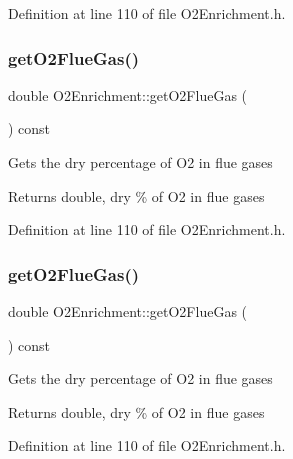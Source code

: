 Definition at line 110 of file O2\+Enrichment.\+h.

\mbox{\label{class_o2_enrichment_a1d31e1aef5f5a92f38c9a07216d0e539}} 
\subsubsection{\texorpdfstring{get\+O2\+Flue\+Gas()}{getO2FlueGas()}\hspace{0.1cm}{\footnotesize\ttfamily [2/3]}}
{\footnotesize\ttfamily double O2\+Enrichment\+::get\+O2\+Flue\+Gas (\begin{DoxyParamCaption}{ }\end{DoxyParamCaption}) const\hspace{0.3cm}{\ttfamily [inline]}}

Gets the dry percentage of O2 in flue gases \begin{DoxyReturn}{Returns}
double, dry \% of O2 in flue gases 
\end{DoxyReturn}


Definition at line 110 of file O2\+Enrichment.\+h.

\mbox{\label{class_o2_enrichment_a1d31e1aef5f5a92f38c9a07216d0e539}} 
\subsubsection{\texorpdfstring{get\+O2\+Flue\+Gas()}{getO2FlueGas()}\hspace{0.1cm}{\footnotesize\ttfamily [3/3]}}
{\footnotesize\ttfamily double O2\+Enrichment\+::get\+O2\+Flue\+Gas (\begin{DoxyParamCaption}{ }\end{DoxyParamCaption}) const\hspace{0.3cm}{\ttfamily [inline]}}

Gets the dry percentage of O2 in flue gases \begin{DoxyReturn}{Returns}
double, dry \% of O2 in flue gases 
\end{DoxyReturn}


Definition at line 110 of file O2\+Enrichment.\+h.

